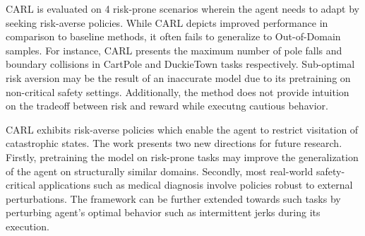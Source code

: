 \documentclass[11pt,letterpaper]{article}
\begin{document}
CARL is evaluated on 4 risk-prone scenarios wherein the agent needs to adapt by seeking risk-averse policies. While CARL depicts improved performance in comparison to baseline methods, it often fails to generalize to Out-of-Domain samples. For instance, CARL presents the maximum number of pole falls and boundary collisions in CartPole and DuckieTown tasks respectively. Sub-optimal risk aversion may be the result of an inaccurate model due to its pretraining on non-critical safety settings. Additionally, the method does not provide intuition on the tradeoff between risk and reward while executng cautious behavior. 

CARL exhibits risk-averse policies which enable the agent to restrict visitation of catastrophic states. The work presents two new directions for future research. Firstly, pretraining the model on risk-prone tasks may improve the generalization of the agent on structurally similar domains. Secondly, most real-world safety-critical applications such as medical diagnosis involve policies robust to external perturbations. The framework can be further extended towards such tasks by perturbing agent's optimal behavior such as intermittent jerks during its execution. 
\end{document}
